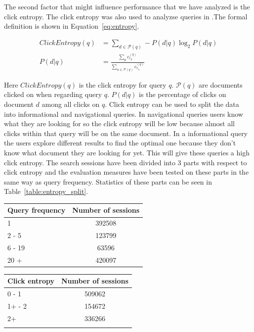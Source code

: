 The second factor that might influence performance that we have analyzed is the click entropy. The click entropy was also used to analyzse queries in \cite{dou2008}.The formal definition is shown in Equation~\ref{eq:entropy}.

\begin{align}
	ClickEntropy(q) &= \sum_{d \in \mathcal{P}(q)} - P(d|q) \log_2 P(d|q) \label{eq:entropy} \\
	P(d|q) &= \frac{\sum_p c_{r_d}^{(q)}}{\sum_{u \in \mathcal{P}(q)} c_{r_u}^{(q)}} \label{eq:entropy_2}
\end{align}

Here $ClickEntropy(q)$ is the click entropy for query $q$. $\mathcal{P}(q)$ are documents clicked on when regarding query $q$. $P(d|q)$ is the percentage of clicks on document $d$ among all clicks on $q$.  Click entropy can be used to split the data into informational and navigational queries. In navigational queries users know what they are looking for so the click entropy will be low because almost all clicks within that query will be on the same document. In a informational query the users explore different results to find the optimal one because they don't know what document they are looking for yet. This will give these queries a high click entropy.
The search sessions have been divided into 3 parts with respect to click entropy and the evaluation measures have been tested on these parts in the same way as query frequency. Statistics of these parts can be seen in Table~\ref{table:entropy_split}.
\\

\begin{minipage}[b]{.45\textwidth}
	\centering
\begin{tabular}{lc}
\hline
Query frequency & Number of sessions \\ \midrule
1               & 392508            \\ 
2 - 5           & 123799            \\ 
6 - 19          & 63596             \\ 
20 +            & 420097            \\ \bottomrule
\end{tabular}
\label{table:query_split}
\end{minipage}
\qquad
\begin{minipage}[b]{.45\textwidth}
	\centering
\begin{tabular}{lc}
\toprule
Click entropy & Number of sessions \\ \midrule
0 - 1         & 509062             \\ 
1+ - 2        & 154672             \\ 
2+            & 336266             \\ \bottomrule \\
\end{tabular}
\label{table:entropy_split}
\end{minipage}

